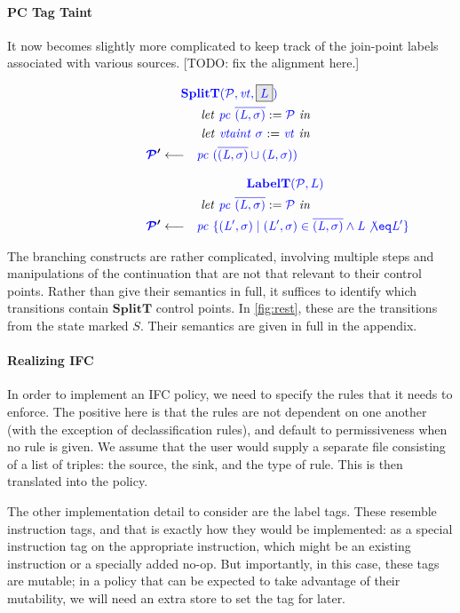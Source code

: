 \documentclass[acmsmall,review,anonymous]{acmart}\settopmatter{printfolios=true,printccs=false,printacmref=false}
\begin{document}
\paragraph*{PC Tag Taint}

It now becomes slightly more complicated to keep track of the join-point labels
associated with various sources. [TODO: fix the alignment here.]

\begin{minipage}[t]{.25\textwidth}
\[\begin{aligned}
\truledef{\splitt}
\letin{\pctaint{\overline{(L,\sigma)}} := \PCT}
\letin{\vtaint{\sigma} := \vt}
\settag{\PCT'}{\pctaint{(\overline{(L,\sigma)} \cup (L,\sigma))}}
\end{aligned}\]
\end{minipage}
\begin{minipage}[t]{.7\textwidth}
\[\begin{aligned}
\truledef{\labelt}
\letin{\pctaint{\overline{(L,\sigma)}} := \PCT}
\settag{\PCT'}{\pctaint{\{(L',\sigma) \mid (L',\sigma) \in \overline{(L,\sigma)} \land L \not \eq L'\}}}
\end{aligned}\]
\end{minipage}

The branching constructs are rather complicated, involving multiple steps
and manipulations of the continuation that are not that relevant to their control
points. Rather than give their semantics in full, it suffices to identify which
transitions contain \(\mathbf{SplitT}\) control points. In \cref{fig:rest}, these
are the transitions from the state marked \(S\). Their semantics are given in full
in the appendix.

\paragraph*{Realizing IFC}

In order to implement an IFC policy, we need to specify the rules that it needs to enforce.
The positive here is that the rules are not dependent on one another (with the exception of
declassification rules), and default to permissiveness when no rule is given. We assume that
the user would supply a separate file consisting of a list of triples: the source, the sink,
and the type of rule. This is then translated into the policy.

The other implementation detail to consider are the label tags. These resemble
instruction tags, and that is exactly how they would be implemented: as a special instruction
tag on the appropriate instruction, which might be an existing instruction or a specially
added no-op. But importantly, in this case, these tags are mutable; in a policy that can be
expected to take advantage of their mutability, we will need an extra store to set the tag
for later.
\end{document}
